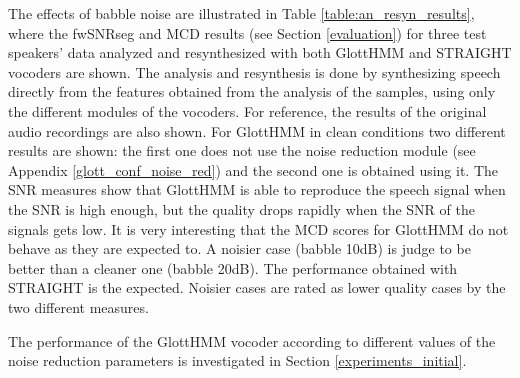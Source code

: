The effects of babble noise are illustrated in Table \ref{table:an_resyn_results}, where the fwSNRseg and MCD results (see Section \ref{evaluation}) for three test speakers' data analyzed and resynthesized with both GlottHMM and STRAIGHT vocoders are shown.
%
The analysis and resynthesis is done by synthesizing speech directly from the features obtained from the analysis of the samples, using only the different modules of the vocoders.
%
For reference, the results of the original audio recordings are also shown.
%
For GlottHMM in clean conditions two different results are shown: the first one does not use the noise reduction module (see Appendix \ref{glott_conf_noise_red}) and the second one is obtained using it.
%
The SNR measures show that GlottHMM is able to reproduce the speech signal when the SNR is high enough, but the quality drops rapidly when the SNR of the signals gets low.
%
It is very interesting that the MCD scores for GlottHMM do not behave as they are expected to.
%
A noisier case (babble 10dB) is judge to be better than a cleaner one (babble 20dB).
%
The performance obtained with STRAIGHT is the expected.
%
Noisier cases are rated as lower quality cases by the two different measures.

The performance of the GlottHMM vocoder according to different values of the noise reduction parameters is investigated in Section \ref{experiments_initial}.